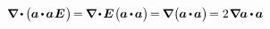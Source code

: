 ${
\boldnabla \hspace{-0.16ex} \dotp \hspace{-0.12ex} \bigl( \hspace{-0.05ex} \bm{a} \hspace{-0.17ex} \dotp \hspace{-0.2ex} \bm{a} \hspace{.1ex} \bm{E} \hspace{.12ex} \bigr) \hspace{-0.33ex}
= \hspace{-0.15ex} \boldnabla \hspace{-0.2ex} \dotp \hspace{-0.22ex}  \bm{E} \hspace{.13ex} \bigl( \hspace{-0.1ex} \bm{a} \hspace{-0.17ex} \dotp \hspace{-0.2ex} \bm{a} \bigr) \hspace{-0.33ex}
= \hspace{-0.15ex} \boldnabla \hspace{.1ex} \bigl( \hspace{-0.1ex} \bm{a} \hspace{-0.17ex} \dotp \hspace{-0.2ex} \bm{a} \bigr) \hspace{-0.33ex}
= 2 \hspace{.16ex} \boldnabla \hspace{-0.1ex} \bm{a} \hspace{-0.12ex} \dotp \hspace{-0.15ex} \bm{a}
}$

